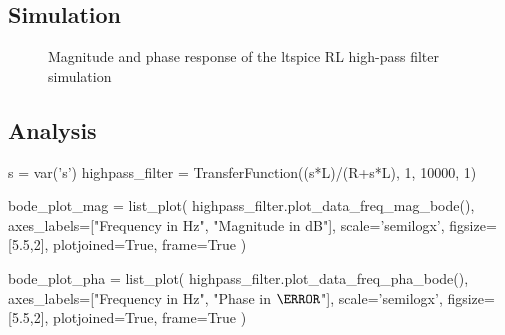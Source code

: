 \subsection{Simulation}


\begin{figure}[H]
    \centering
    \begin{subfigure}{\textwidth}
        \centering
    \end{subfigure}
    \quad
    \begin{subfigure}{\textwidth}
        \centering
    \end{subfigure}
    \caption{Magnitude and phase response of the ltspice RL high-pass filter simulation}
\end{figure}

\subsection{Analysis}

\begin{sagesilent}
    s = var('s')
    highpass_filter = TransferFunction((s*L)/(R+s*L), 1, 10000, 1)

    bode_plot_mag = list_plot(
        highpass_filter.plot_data_freq_mag_bode(),
        axes_labels=["Frequency in Hz", "Magnitude in dB"],
        scale='semilogx',
        figsize=[5.5,2],
        plotjoined=True,
        frame=True
    )

    bode_plot_pha = list_plot(
        highpass_filter.plot_data_freq_pha_bode(),
        axes_labels=["Frequency in Hz", "Phase in $\degree$"],
        scale='semilogx',
        figsize=[5.5,2],
        plotjoined=True,
        frame=True
    )
\end{sagesilent}

